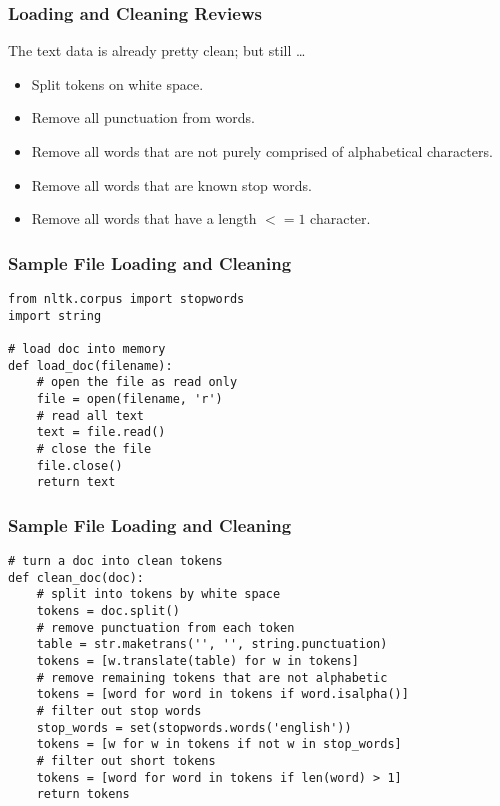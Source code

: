 \begin{frame}[fragile]\frametitle{Loading and Cleaning Reviews}
The text data is already pretty clean; but still \ldots
\begin{itemize}
\item Split tokens on white space.
\item Remove all punctuation from words.
\item Remove all words that are not purely comprised of alphabetical characters.
\item Remove all words that are known stop words.
\item Remove all words that have a length $<= 1$ character.
\end{itemize}
\end{frame}

\begin{frame}[fragile]\frametitle{Sample File Loading and Cleaning}
\begin{lstlisting}
from nltk.corpus import stopwords
import string
 
# load doc into memory
def load_doc(filename):
	# open the file as read only
	file = open(filename, 'r')
	# read all text
	text = file.read()
	# close the file
	file.close()
	return text
\end{lstlisting}
\end{frame}

\begin{frame}[fragile]\frametitle{Sample File Loading and Cleaning}
\begin{lstlisting}
# turn a doc into clean tokens
def clean_doc(doc):
	# split into tokens by white space
	tokens = doc.split()
	# remove punctuation from each token
	table = str.maketrans('', '', string.punctuation)
	tokens = [w.translate(table) for w in tokens]
	# remove remaining tokens that are not alphabetic
	tokens = [word for word in tokens if word.isalpha()]
	# filter out stop words
	stop_words = set(stopwords.words('english'))
	tokens = [w for w in tokens if not w in stop_words]
	# filter out short tokens
	tokens = [word for word in tokens if len(word) > 1]
	return tokens
\end{lstlisting}
\end{frame}

